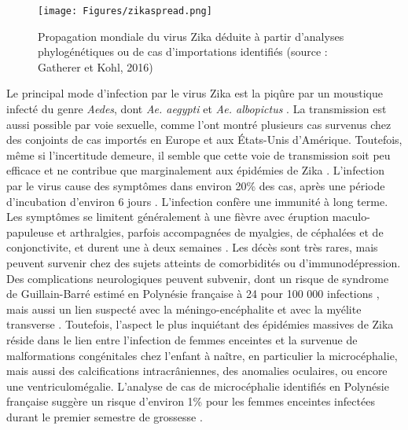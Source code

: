 \begin{figure}[t]
	\centering
	\texttt{[image: Figures/zikaspread.png]}
	\caption{Propagation mondiale du virus Zika déduite à partir d'analyses phylogénétiques ou de cas d'importations identifiés (source : Gatherer et Kohl, 2016)}
	\label{fig:zika2007}
\end{figure}

Le principal mode d'infection par le virus Zika est la piqûre par un moustique infecté du genre {\em Aedes}, dont {\em Ae. aegypti} et {\em Ae. albopictus} \cite{cornet1979transmission,wong2013aedes}.
La transmission est aussi possible par voie sexuelle, comme l'ont montré plusieurs cas survenus chez des conjoints de cas importés en Europe et aux \'Etats-Unis d'Amérique.
Toutefois, même si l'incertitude demeure, il semble que cette voie de transmission soit peu efficace et ne contribue que marginalement aux épidémies de Zika \cite{althaus_how_2016}.
L'infection par le virus cause des symptômes dans environ 20\% des cas, après une période d'incubation d'environ 6 jours \cite{lessler2016times}.
L'infection confère une immunité à long terme. 
Les symptômes se limitent généralement à une fièvre avec éruption maculo-papuleuse et arthralgies, parfois accompagnées de myalgies, de céphalées et de conjonctivite, et durent une à deux semaines \cite{lessler2016assessing}.
Les décès sont très rares, mais peuvent survenir chez des sujets atteints de comorbidités ou d'immunodépression.
Des complications neurologiques peuvent subvenir, dont un risque de syndrome de Guillain-Barré estimé en Polynésie française à 24 pour 100 000 infections \cite{cao2016guillain}, mais aussi un lien suspecté avec la méningo-encéphalite et avec la myélite transverse \cite{lessler2016assessing}.
Toutefois, l'aspect le plus inquiétant des épidémies massives de Zika réside dans le lien entre l'infection de femmes enceintes et la survenue de malformations congénitales chez l'enfant à naître, en particulier la microcéphalie, mais aussi des calcifications intracrâniennes, des anomalies oculaires, ou encore une ventriculomégalie.
L'analyse de cas de microcéphalie identifiés en Polynésie française suggère un risque d'environ 1\% pour les femmes enceintes infectées durant le premier semestre de grossesse \cite{cauchemez_association_2016}.

